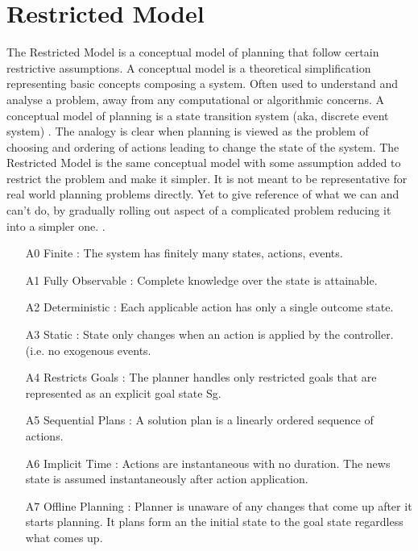 \documentclass
[a4paper
,english
,parskip=half
,bibliography=totoc
]{scrreprt}
\begin{document}
    \section{Restricted Model}
    The Restricted Model is a conceptual model of planning that follow certain restrictive assumptions. A conceptual model is a theoretical simplification representing basic concepts composing a system. Often used to understand and analyse a problem,  away from any computational or algorithmic concerns. A conceptual model of planning is a state transition system (aka, discrete event system) \citep{Dean:1991:PC:116417}. The analogy is clear when planning is viewed as the problem of choosing and ordering of actions leading to change the state of the system. 
     The Restricted Model is the same conceptual model with some assumption added to restrict the problem and make it simpler. It is not meant to be representative for real world planning problems directly. Yet to give reference of what we can and can't do, by gradually rolling out aspect of a complicated problem reducing it into a simpler one. \citep{automated_planning}.
    \begin{itemize}
    \item [A0] Finite :                  The system has finitely many states, actions, events.
    \item [A1] Fully Observable :        Complete knowledge over the state is attainable.
    \item [A2] Deterministic :            Each applicable action has only a single outcome state.
    \item [A3] Static :                   State only changes when an action is applied by the  controller. (i.e. no exogenous events.
    \item [A4] Restricts Goals :   The planner handles only restricted goals that are represented as an explicit goal state Sg.
    \item [A5] Sequential Plans :   A solution plan is a linearly ordered sequence of actions.
    \item [A6] Implicit Time :      Actions are instantaneous with no duration. The news state is assumed instantaneously after action application.
    \item [A7] Offline Planning :  Planner is unaware of any changes that come up after it starts planning. It plans form an the initial state to the goal state regardless what comes up.
    \end{itemize}
\end{document}
